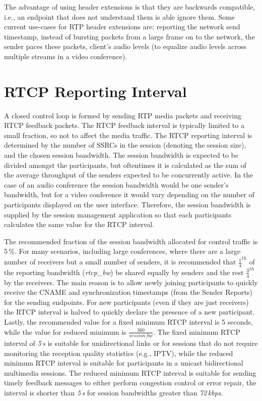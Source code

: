 The advantage of using header extensions is that they are backwards
compatible, i.e., an endpoint that does not understand them is able ignore
them. Some current use-cases for RTP header extensions are: reporting the
network send timestamp, instead of bursting packets from a large frame on to
the network, the sender paces these packets, client's audio levels (to
equalize audio levels across multiple streams in a video conference).

\section{RTCP Reporting Interval}

A closed control loop is formed by sending RTP media packets and receiving
RTCP feedback packets. The RTCP feedback interval is typically limited to a
small fraction, so not to affect the media traffic. The RTCP reporting
interval is determined by the number of SSRCs in the session (denoting the
session size), and the chosen session bandwidth. The session bandwidth is
expected to be divided amongst the participants, but oftentimes it is
calculated as the sum of the average throughput of the senders expected to be
concurrently active. In the case of an audio conference the session bandwidth
would be one sender's bandwidth, but for a video conference it would vary
depending on the number of participants displayed on the user interface.
Therefore, the session bandwidth is supplied by the session management
application so that each participants calculates the same value for the RTCP
interval.


The recommended fraction of the session bandwidth allocated for control
traffic is 5\,\%. For many scenarios, including large conferences, where there
are a large number of receivers but a small number of senders, it is
recommended that $\frac{1}{4}^{th}$ of the reporting bandwidth
(\emph{rtcp\_bw}) be shared equally by senders and the rest $\frac{3}{4}^{th}$
by the receivers. The main reason is to allow newly joining participants to
quickly receive the CNAME and synchronization timestamps (from the Sender
Reports) for the sending endpoints. For new participants (even if they are
just receivers) the RTCP interval is halved to quickly declare the presence of
a new participant. Lastly, the recommended value for a fixed minimum RTCP
interval is 5 seconds, while the value for reduced minimum is
$\frac{360}{session\_bw}$.  The fixed minimum RTCP interval of \emph{5\,s} is
suitable for unidirectional links or for sessions that do not require
monitoring the reception quality statistics (e.g., IPTV), while the reduced
minimum RTCP interval is suitable for participants in a unicast bidirectional
multimedia sessions. The reduced minimum RTCP interval is suitable for sending
timely feedback messages to either perform congestion control or error repair,
the interval is shorter than \emph{5\,s} for session bandwidths greater than
\emph{72\,kbps}.


